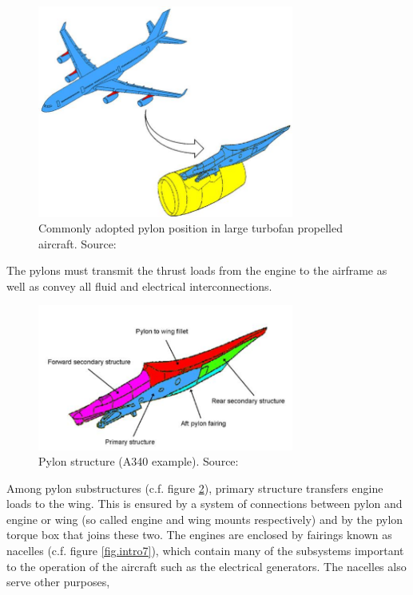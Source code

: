 \begin{figure}[!ht]
	\centering   
	\includegraphics[width=0.75\textwidth]{images/intro/pylon_location}
	\caption{Commonly adopted pylon position in large turbofan propelled aircraft. Source: \cite{ASDM}} 
	\label{fig.intro5}
\end{figure}
The pylons must transmit the thrust loads from the engine to the airframe as well as convey all fluid and electrical
interconnections. 
\begin{figure}[!ht]
	\centering   
	\includegraphics[width=0.75\textwidth]{images/intro/pylonA340}
	\caption{Pylon structure (A340 example). Source: \cite{ASDM}} 
	\label{fig.intro6}
\end{figure}
Among pylon substructures (c.f. figure \ref{fig.intro6}), primary structure transfers engine loads to the wing. This is ensured by a system of connections between pylon and engine or wing (so called engine and wing mounts respectively) and by the pylon torque box that joins these two. The engines are enclosed by fairings known as nacelles (c.f. figure \ref{fig.intro7}), which contain many of the subsystems
important to the operation of the aircraft such as the electrical generators. The nacelles also serve other purposes,
